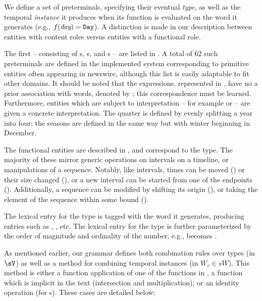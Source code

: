 We define a set of preterminals, specifying their eventual
	\textit{type}, as well as the temporal \textit{instance} it
	produces when its function is evaluated on the word it generates
	(e.g., $f(\textit{day}) = \texttt{Day}$).
A distinction is made in our description between entities with 
	content roles versus entities with a functional role.

The first -- consisting of s, s, and s --
	are listed in .
A total of 62 such preterminals are defined in the implemented system
	corresponding to primitive entities often appearing in newswire,
	although this list is easily adaptable to fit other domains.
It should be noted that the expressions, represented in ,
	have no a prior association with words, denoted by ;
	this correspondence must be learned.
Furthermore, entities which are subject to interpretation -- for example
	 or  -- are given a concrete interpretation.
The  quarter is defined by evenly splitting a year into four;
	the seasons are defined in the same way but with winter beginning in December.

The functional entities are described in , and correspond to
	the  type.
The majority of these mirror generic operations on intervals on a timeline,
	or manipulations of a sequence.
Notably, like intervals, times can be moved () or
	their size changed (), or
	a new interval can be started from one of the endpoints
	().
Additionally, a sequence can be modified by shifting its origin
	(), 
	or taking the  element of the sequence within some bound
	().

The lexical entry for the  type is tagged with the word it
	generates, producing entries such as , , etc.
The lexical entry for the  type is further parameterized by
	the order of magnitude and ordinality of the number; e.g.,
	 becomes .


As mentioned earlier, our grammar defines both combination rules
	over types (in $\sV$) as well as a method for combining temporal
	instances (in $W_v \in sW$).
This method is either a function application of one of the functions in
	, a function which is implicit in the text
	(intersection and multiplication), or an identity operation (for s).
These cases are detailed below:

